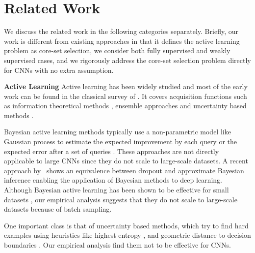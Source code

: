 \documentclass{article} \usepackage{iclr2018_conference,times}
\begin{document}
\section{Related Work} We discuss the related work in the following categories
separately. Briefly, our work is different from existing approaches in that 
it defines the active learning problem as core-set selection,  we consider
both fully supervised and weakly supervised cases, and  we rigorously
address the core-set selection problem directly for CNNs with no extra
assumption. 


\noindent\textbf{Active Learning} Active learning has been widely studied and
most of the early work can be found in the classical survey
of \citet{settles2010active}. It covers acquisition functions such as
information theoretical methods \citep{mackay1992information}, ensemble
approaches \citep{mccallumzy1998employing, freund1997selective} and uncertainty
based methods
\citep{tong2001support,joshi2009multi,li2013adaptive}.

Bayesian active learning methods typically use a non-parametric model like
Gaussian process to estimate the expected improvement by each query
\citep{kapoor2007active} or the expected error after a set of queries
\citep{roy2001toward}. These approaches are not directly applicable to large CNNs since they do not scale to large-scale datasets. A recent approach by~\citet{gal_bayes} shows an equivalence between dropout and approximate
Bayesian inference enabling the application of Bayesian methods to deep
learning. Although Bayesian active learning has been shown to be effective
for small datasets \citep{gal_active}, our empirical analysis suggests that they do not scale to large-scale datasets because of batch sampling.

One important class is that of uncertainty based methods, which try to find hard
examples using heuristics like highest entropy \citep{joshi2009multi}, and
geometric distance to decision boundaries
\citep{tong2001support,brinker2003incorporating}. Our empirical analysis find them not to be effective for CNNs.
\end{document}
